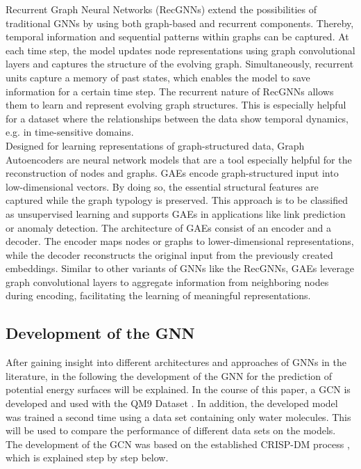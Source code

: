 Recurrent Graph Neural Networks (RecGNNs) extend the possibilities of traditional GNNs by using both graph-based and recurrent components. Thereby, temporal information and sequential patterns within graphs can be captured. At each time step, the model updates node representations using graph convolutional layers and captures the structure of the evolving graph. Simultaneously, recurrent units capture a memory of past states, which enables the model to save information for a certain time step. The recurrent nature of RecGNNs allows them to learn and represent evolving graph structures. This is especially helpful for a dataset where the relationships between the data show temporal dynamics, e.g. in time-sensitive domains. \cite{li2017diffusion,hajiramezanali2019variational} \\

Designed for learning representations of graph-structured data, Graph Autoencoders are neural network models that are a tool especially helpful for the reconstruction of nodes and graphs. GAEs encode graph-structured input into low-dimensional vectors. By doing so, the essential structural features are captured while the graph typology is preserved. This approach is to be classified as unsupervised learning and supports GAEs in applications like link prediction or anomaly detection. The architecture of GAEs consist of an encoder and a decoder. The encoder maps nodes or graphs to lower-dimensional representations, while the decoder reconstructs the original input from the previously created embeddings. Similar to other variants of GNNs like the RecGNNs, GAEs leverage graph convolutional layers to aggregate information from neighboring nodes during encoding, facilitating the learning of meaningful representations. \cite{li2021adaptive, zhang2021graph}

\subsection{Development of the GNN}
After gaining insight into different architectures and approaches of GNNs in the literature, in the following the development of the GNN for the prediction of potential energy surfaces will be explained. In the course of this paper, a GCN is developed and used with the QM9 Dataset \cite{noauthor_torch_geometricdatasetsqm9_nodate}. In addition, the developed model was trained a second time using a data set containing only water molecules. This will be used to compare the performance of different data sets on the models. The development of the GCN was based on the established CRISP-DM process \cite{wirth2000crisp}, which is explained step by step below. \\

